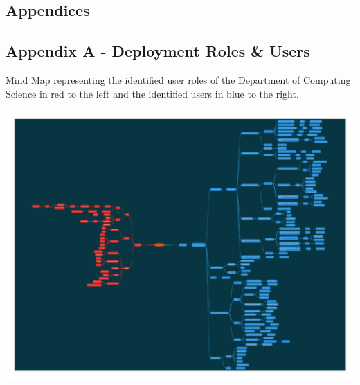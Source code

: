 \begin{appendices}

\chapter{Appendices}

\section{Appendix A - Deployment Roles \& Users}
\label{appendix:roles_users}

Mind Map representing the identified user roles of the Department of Computing Science in red to the left and the identified users in blue to the right.

\includegraphics[width=\linewidth]{appendices/mind_maps/ABE_Users_slides_Oct26.pdf}

\end{appendices}
